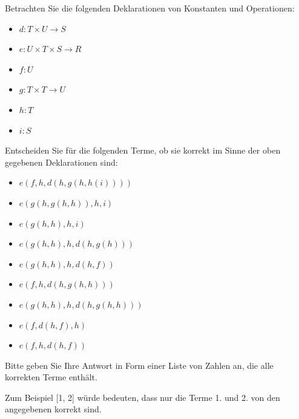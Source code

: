 Betrachten Sie die folgenden Deklarationen von Konstanten und Operationen:

\begin{itemize}
\item[] $\mathit{d} : \mathit{T} \times \mathit{U} \to \mathit{S}$
\item[] $\mathit{e} : \mathit{U} \times \mathit{T} \times \mathit{S} \to \mathit{R}$
\item[] $\mathit{f} : \mathit{U}$
\item[] $\mathit{g} : \mathit{T} \times \mathit{T} \to \mathit{U}$
\item[] $\mathit{h} : \mathit{T}$
\item[] $\mathit{i} : \mathit{S}$\end{itemize}Entscheiden Sie für die folgenden Terme, ob sie korrekt im Sinne der oben gegebenen Deklarationen sind:

\begin{itemize}
\item[1.]$\mathit{e(f,h,d(h,g(h,h(i))))}$
\item[2.]$\mathit{e(g(h,g(h,h)),h,i)}$
\item[3.]$\mathit{e(g(h,h),h,i)}$
\item[4.]$\mathit{e(g(h,h),h,d(h,g(h)))}$
\item[5.]$\mathit{e(g(h,h),h,d(h,f))}$
\item[6.]$\mathit{e(f,h,d(h,g(h,h)))}$
\item[7.]$\mathit{e(g(h,h),h,d(h,g(h,h)))}$
\item[8.]$\mathit{e(f,d(h,f),h)}$
\item[9.]$\mathit{e(f,h,d(h,f))}$\end{itemize}Bitte geben Sie Ihre Antwort in Form einer Liste von Zahlen an, die alle korrekten Terme enthält.

Zum Beispiel [1, 2] würde bedeuten, dass nur die Terme 1. und 2. von den angegebenen korrekt sind.

